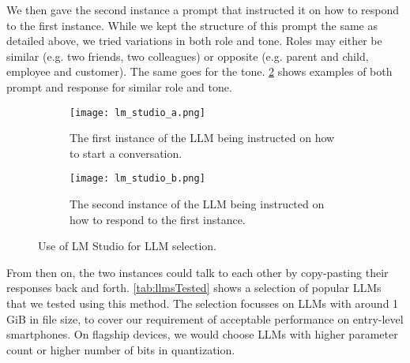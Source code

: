 We then gave the second instance a prompt that instructed it on how to respond to the first instance. While we kept the structure of this prompt the same as detailed above, we tried variations in both role and tone. Roles may either be similar (e.g. two friends, two colleagues) or opposite (e.g. parent and child, employee and customer). The same goes for the tone. \cref{fig:lmStudioB} shows examples of both prompt and response for similar role and tone.

\begin{figure}
	\begin{wide}
		\captionsetup{width=\linewidth}

		\begin{subfigure}{\linewidth}
			\centering
			\texttt{[image: lm\_studio\_a.png]}
			\caption{The first instance of the LLM being instructed on how to start a conversation.}
			\label{fig:lmStudioA}
		\end{subfigure}

		\begin{subfigure}{\linewidth}
			\centering
			\texttt{[image: lm\_studio\_b.png]}
			\caption{The second instance of the LLM being instructed on how to respond to the first instance.}
			\label{fig:lmStudioB}
		\end{subfigure}

		\caption[LM Studio]{Use of LM Studio for LLM selection.}
		\label{fig:lmStudio}
	\end{wide}
\end{figure}

From then on, the two instances could talk to each other by copy-pasting their responses back and forth. \cref{tab:llmsTested} shows a selection of popular \glspl{LLM} that we tested using this method. The selection focusses on \glspl{LLM} with around 1 GiB in file size, to cover our requirement of acceptable performance on entry-level smartphones. On flagship devices, we would choose \glspl{LLM} with higher parameter count or higher number of bits in quantization.

